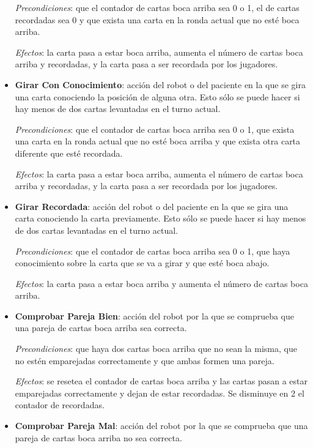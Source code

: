 \documentclass{uc3mpracticas}
\begin{document}
\begin{itemize}
      \textit{Precondiciones}: que el contador de cartas boca arriba sea 0 o 1, el de cartas recordadas sea 0 y que exista una carta en la ronda actual que no esté boca arriba.

      \textit{Efectos}: la carta pasa a estar boca arriba, aumenta el número de cartas boca arriba y recordadas, y la carta pasa a ser recordada por los jugadores.

    \item \textbf{Girar Con Conocimiento}: acción del robot o del paciente en la que se gira una carta conociendo la posición de alguna otra. Esto sólo se puede hacer si hay menos de dos cartas levantadas en el turno actual.

      \textit{Precondiciones}: que el contador de cartas boca arriba sea 0 o 1, que exista una carta en la ronda actual que no esté boca arriba y que exista otra carta diferente que esté recordada.

      \textit{Efectos}: la carta pasa a estar boca arriba, aumenta el número de cartas boca arriba y recordadas, y la carta pasa a ser recordada por los jugadores.

    \item \textbf{Girar Recordada}: acción del robot o del paciente en la que se gira una carta conociendo la carta previamente. Esto sólo se puede hacer si hay menos de dos cartas levantadas en el turno actual.

      \textit{Precondiciones}: que el contador de cartas boca arriba sea 0 o 1, que haya conocimiento sobre la carta que se va a girar y que esté boca abajo.

      \textit{Efectos}: la carta pasa a estar boca arriba y aumenta el número de cartas boca arriba.

    \item \textbf{Comprobar Pareja Bien}: acción del robot por la que se comprueba que una pareja de cartas boca arriba sea correcta.

      \textit{Precondiciones}: que haya dos cartas boca arriba que no sean la misma, que no estén emparejadas correctamente y que ambas formen una pareja.

      \textit{Efectos}: se resetea el contador de cartas boca arriba y las cartas pasan a estar emparejadas correctamente y dejan de estar recordadas. Se disminuye en 2 el contador de recordadas.

    \item \textbf{Comprobar Pareja Mal}: acción del robot por la que se comprueba que una pareja de cartas boca arriba no sea correcta.


\end{itemize}
\end{document}
